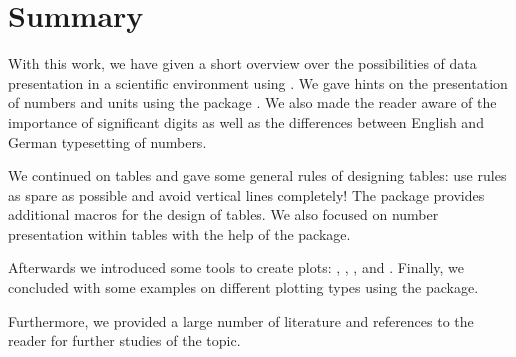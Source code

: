 \section{Summary}

With this work, we have given a short overview over the possibilities of data
presentation in a scientific environment using .  We gave hints on
the presentation of numbers and units using the package .  We
also made the reader aware of the importance of significant digits as well as
the differences between English and German typesetting of numbers.

We continued on tables and gave some general rules of designing tables: use
rules as spare as possible and avoid vertical lines completely!  The
 package provides additional macros for the design of tables.
We also focused on number presentation within tables with the help of the
 package.

Afterwards we introduced some tools to create plots: ,
, , and .  Finally, we
concluded with some examples on different plotting types using the
 package.

Furthermore, we provided a large number of literature and references to the
reader for further studies of the topic.
